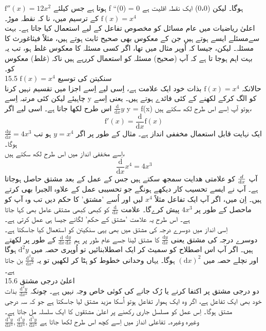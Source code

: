 \( \text{f}''(x) = 12x^{2} \)
	  ہوتا ہے جس کیلئے f ``(0) = 0  ہوگا۔ لیکن (0،0) ایک نقطہ اقلیت ہے
\( \text{f}(x) = x^{4 }\)
	  کے ترسیم میں، نا کہ نقطہ موڑ۔\\
اعلیٰ ریاضیات  میں عام مسائل  کو مخصوص تفاعل کے لیے استعمال کیا جاتا ہے۔ بہت سےمسئلے ایسے ہوتے ہیں جن کے معکوس بھی صحیح ثابت ہوتے ہیں، مثلاً فیثاغورث کا مسئلہ۔ لیکن، جیسا کہ اُوپر مثال میں تھا، اگر کسی مسئلہ کا معکوس غلط ہو، تب یہ بہت اہم ہوجا تا ہے کہ آپ (صحیح) مسئلہ کو استعمال کررہے ہیں ناکہ (غلط) معکوس کو۔ \\
15.5 \( \text{f}(x) = x^4 \)
 سنکیتن  کی توسیع\\
	حالانکہ 
\( \text{f}(x) = x^4 \)
	 بذات خود ایک علامت ہے، اِسی لیے اِسے اجزا میں تقسیم نہیں کرنا چاہیئے لیکن کئی مرتبہ اِسے y کو الگ کرکے لکھنے کے کئی فائدے ہوتے ہیں۔ یعنی اِسے 
\( \frac{\text{d}}{\text{d}x}y \)
	  اس طرح لکھا جاتا ہے۔ اسی لیے اگر  y = f(x) ہوتو آپ اِسے اس طرح لکھ سکتے ہیں،\\
\[ \text{f}'(x) = \frac{\text{d}}{\text{d}x}\text{f}(x) \]
ایک نہایت قابل استعمال مخففی انداز ہے۔ مثال کے طور پر اگر 
\( y = x^{4 }\)
  ہو تب
\( \frac{\text{d}y}{\text{d}x} = 4x^3 \)
    ہوگا۔ \\
اِسے مخففی انداز میں اس طرح لکھ سکتے ہیں، 
\[ \frac{\text{d}}{\text{d}x}x^4 = 4x^3 \]
آپ
\(\frac{d}{\dif{x}}\)
کو علامتی ھدایت  سمجھ سکتے ہیں جس کے عمل کے بعد مشتق حاصل ہوجاتا ہے۔ آپ نے ایسے تحسیب کار دیکھے ہونگے جو تحسیبی عمل کے علاوہ الجبرا بھی کرتے ہیں۔ اِن میں، اگر آپ ایک تفاعل مثلاً
\( x^{4} \)
لیں اور اُسے 'مشتق' کا حکم  دیں تب وہ آپ کو ماحصل کے طور پر 
\( 4x^{3} \)
پیش کرےگا۔ علامت
\( \frac{\text{d}}{\text{d}x} \)
 کو کبھی کبھی مشتقی عامل  بھی کہا جاتا ہے۔ اس طرح یہ علامت 'مشتق کے حکم' لگانے جیسا ہی عمل کرتی ہے۔ \\
	اِسی انداز میں دوسرے درجہ کی مشتق میں بھی یہی سنکیتن کو استعمال کیا جاسکتا ہے۔ \\
دوسرے درجہ کی مشتق یعنی
\( \frac{\text{d}y}{\text{d}x} \)
 کا مشتق لینا جسے عام طور پر ہم
\( \frac{\text{d}}{\text{d}x}\frac{\text{d}y}{\text{d}x} \)
 کے طور پر لکھتے ہیں۔ اگر آپ اس اصطلاح کو سمیٹ کر ایک اصطلابنائیں تو اُوپری حصہ میں
\( \text{d}^2y \)
   ہوگا اور نچلے حصہ میں 
\( (\text{d}x)^2 \)
   ہوگا۔  یہاں وحدانی خطوط کو ہٹا کر لکھیں تو یہ 
\( \frac{\text{d}^2y}{\text{d}x^2} \)
    بن جاتا ہے۔ \\
15.6 اعلیٰ درجی مشتق\\
	دو درجی مشتق پر اکتفا کرنے یا رُک جانے کی کوئی خاص وجہ نہیں ہے۔ چونکہ 
\( \frac{\text{d}^2y}{\text{d}x^2} \)
	 بذات خود بھی ایک تفاعل ہے، اگر وہ ایک ہموار تفاعل ہوتو اُسکا مزید مشتق لیا جاسکتا ہے جو کہ سہ درجی مشتق ہوگا۔ اِس عمل کو مسلسل جاری رکھنے پر اعلیٰ مشتقوں کا ایک سلسلہ مل جاتا ہے۔\\
	 \( \frac{\text{d}^{3}y}{\text{d}x^{3}},\frac{\text{d}^{4}y}{\text{d}x^{4}},\frac{\text{d}^{5}y}{\text{d}x^{5}}\)
	   وغیرہ وغیرہ۔ تفاعلی انداز میں اِسے کچھ اس طرح لکھا جاتا ہے

